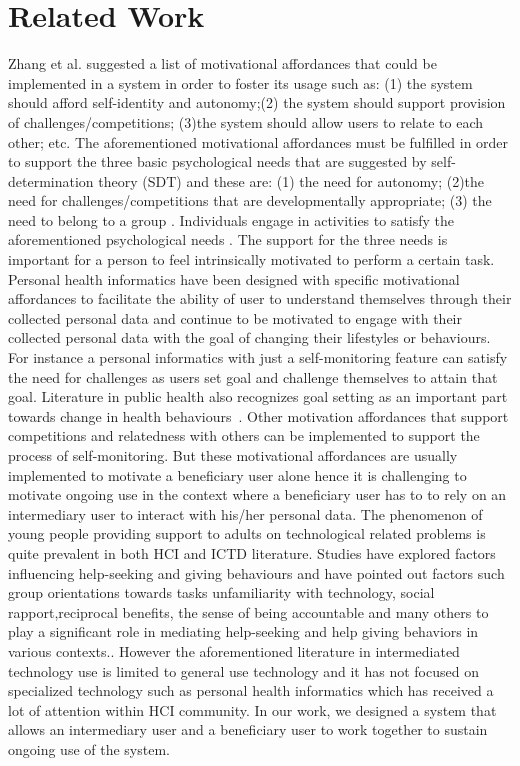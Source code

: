 \documentclass{sig-alternate}
\begin{document}
\section{Related Work} 
Zhang et al.\cite{zhang2008:motivational} suggested a list of motivational affordances that could be implemented in a system in order to foster its usage such as: (1) the system should afford self-identity and autonomy;(2) the system should support provision of challenges/competitions; (3)the system should allow users to relate to each other; etc. The aforementioned motivational affordances must be fulfilled in order to support the three basic psychological needs that are suggested by self-determination theory (SDT) and these are: (1) the need for autonomy; (2)the need for challenges/competitions that are developmentally appropriate;  (3) the need to belong to a group \cite{deci1985:intrinsic}. Individuals engage in activities to satisfy the aforementioned psychological needs \cite{deterding2011:situated}. The support for the three needs is important for a person to feel intrinsically motivated to perform a certain task.\newline     
Personal health informatics have been designed with specific motivational affordances to facilitate the ability of user to understand themselves through their collected personal data and continue to be motivated to engage with their collected personal data with the goal of changing their lifestyles or behaviours. For instance a personal informatics with just a self-monitoring feature can satisfy the need for challenges as users set goal and challenge themselves to attain that goal. Literature in public health also recognizes goal setting as an important part towards change in health behaviours~\cite{strecher1995goal}. Other motivation affordances that support competitions and relatedness with others can be implemented to support the process of self-monitoring. But these motivational affordances are usually implemented to motivate a beneficiary user alone hence it is challenging to motivate ongoing use in the context where a beneficiary user has to to rely on an intermediary user to interact with his/her personal data.
The phenomenon of young people providing support to adults on technological related problems is quite prevalent in both HCI and ICTD literature. Studies have explored factors influencing help-seeking and giving behaviours and have pointed out factors such group orientations towards tasks unfamiliarity with technology, social rapport,reciprocal benefits, the sense of being accountable and many others to play a significant role in mediating help-seeking and help giving behaviors in various contexts.\cite{sambasivan2010,poole:chh,kiesler:twi,parikh2006}. However the aforementioned literature in intermediated technology use is limited to general use technology and it has not focused on specialized technology such as personal health informatics which has received a lot of attention within HCI community. In our work, we designed a system that allows an intermediary user and a beneficiary user to work together to sustain ongoing use of the system.\newline
\end{document}
